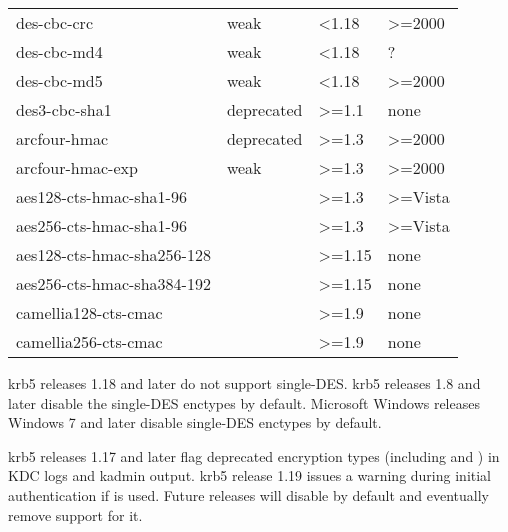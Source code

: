 \documentclass[letterpaper,10pt,english]{sphinxmanual}
\begin{document}
\begin{savenotes}\sphinxattablestart
\centering
\begin{tabulary}{\linewidth}[t]{|T|T|T|T|}
\hline
{}\relax &\relax &\relax &\relax \\
\hline
des-cbc-crc
&
weak
&
\textless{}1.18
&
\textgreater{}=2000
\\
\hline
des-cbc-md4
&
weak
&
\textless{}1.18
&
?
\\
\hline
des-cbc-md5
&
weak
&
\textless{}1.18
&
\textgreater{}=2000
\\
\hline
des3-cbc-sha1
&
deprecated
&
\textgreater{}=1.1
&
none
\\
\hline
arcfour-hmac
&
deprecated
&
\textgreater{}=1.3
&
\textgreater{}=2000
\\
\hline
arcfour-hmac-exp
&
weak
&
\textgreater{}=1.3
&
\textgreater{}=2000
\\
\hline
aes128-cts-hmac-sha1-96
&&
\textgreater{}=1.3
&
\textgreater{}=Vista
\\
\hline
aes256-cts-hmac-sha1-96
&&
\textgreater{}=1.3
&
\textgreater{}=Vista
\\
\hline
aes128-cts-hmac-sha256-128
&&
\textgreater{}=1.15
&
none
\\
\hline
aes256-cts-hmac-sha384-192
&&
\textgreater{}=1.15
&
none
\\
\hline
camellia128-cts-cmac
&&
\textgreater{}=1.9
&
none
\\
\hline
camellia256-cts-cmac
&&
\textgreater{}=1.9
&
none
\\
\hline
\end{tabulary}
\par
\sphinxattableend\end{savenotes}

krb5 releases 1.18 and later do not support single-DES.  krb5 releases
1.8 and later disable the single-DES enctypes by default.  Microsoft
Windows releases Windows 7 and later disable single-DES enctypes by
default.

krb5 releases 1.17 and later flag deprecated encryption types
(including  and ) in KDC logs and
kadmin output.  krb5 release 1.19 issues a warning during initial
authentication if  is used.  Future releases will
disable  by default and eventually remove support for
it.
\end{document}
